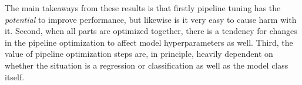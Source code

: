 \documentclass[12pt, letterpaper]{article}
\begin{document}
The main takeaways from these results is that firstly pipeline tuning has the \emph{potential} to improve performance, but likewise is it very easy to cause harm with it. Second, when all parts are optimized together, there is a tendency for changes in the pipeline optimization to affect model hyperparameters as well. Third, the value of pipeline optimization steps are, in principle, heavily dependent on whether the situation is a regression or classification as well as the model class itself.

\end{document}
